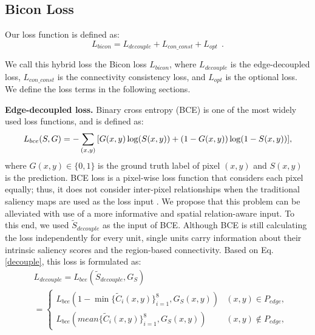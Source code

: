 \documentclass[review]{cvpr}
\begin{document}
\subsection{Bicon Loss}
Our loss function is defined as:
\begin{equation}
{L_{bicon}} = {L_{decouple}} + {L_{con\_const}} + {L_{opt}}\ \ .
\end{equation}


We call this hybrid loss the Bicon loss $L_{bicon}$, where $L_{decouple}$ is the edge-decoupled loss, $L_{con\_const}$ is the connectivity consistency loss, and $L_{opt}$ is the optional loss. We define the loss terms in the following sections.


\textbf{Edge-decoupled loss.} Binary cross entropy (BCE) \cite{BCE} is one of the most widely used loss functions, and is defined as:
\begin{equation}
\vspace{-3pt}
{ L_{bce}(S,G) = -\sum\limits_{(x,y)} {[G(x,y)\log (} {S}(x,y)) + (1 - {G}(x,y))\log (1 - S(x,y))],}
\end{equation}
where $G(x,y)\in \{0,1\}$ is the ground truth label of pixel $(x,y)$ and $S(x,y)$ is the prediction. BCE loss is a pixel-wise loss function that considers each pixel equally; thus, it does not consider inter-pixel relationships when the traditional saliency maps are used as the loss input \cite{MINet,f-loss,basnet}. We propose that this problem can be alleviated with use of a more informative and spatial relation-aware input. To this end, we used $\widetilde S_{decouple}$ as the input of BCE. Although BCE is still calculating the loss independently for every unit, single units carry information about their intrinsic saliency scores and the region-based connectivity. Based on Eq. \ref{decouple}, this loss is formulated as:
\begin{equation}
{
\begin{aligned}
&{L_{decouple}} = {L_{bce}}({\widetilde S_{decouple}},{G_S})\\
& =\begin{cases}
{{L_{bce}}(1 - \min \{ {{\widetilde C}_i}(x,y)\} _{i = 1}^8,{G_S}(x,y))} &{(x,y)\in {P_{edge}}},\\
{{L_{bce}}(mean\{ {{\widetilde C}_i}(x,y)\} _{i = 1}^8,{G_S}(x,y))}& {(x,y) \notin {P_{edge}}},
\end{cases}
\end{aligned}}
\end{equation}
\end{document}
